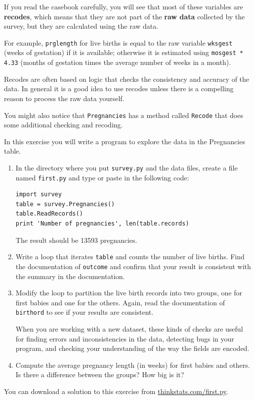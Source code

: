 \documentclass[12pt]{book}
\begin{document}
If you read the casebook carefully, you will see that most of these
variables are {\bf recodes}, which means that they are not part
of the {\bf raw data} collected by the survey, but they are
calculated using the raw data.

For example, {\tt prglength} for live births is equal to the raw
variable {\tt wksgest} (weeks of gestation) if it is available;
otherwise it is estimated using {\tt mosgest * 4.33} (months of
gestation times the average number of weeks in a month).

Recodes are often based on logic that checks the consistency and
accuracy of the data.  In general it is a good idea to use recodes
unless there is a compelling reason to process the raw data
yourself.

You might also notice that {\tt Pregnancies} has a method called
{\tt Recode} that does some additional checking and recoding.

\begin{ex}

In this exercise you will write a program to explore the data
in the Pregnancies table.

\begin{enumerate}

\item In the directory where you put {\tt survey.py} and the
data files, create a file named \verb"first.py" and
type or paste in the following code:

\begin{verbatim}
import survey
table = survey.Pregnancies()
table.ReadRecords()
print 'Number of pregnancies', len(table.records)
\end{verbatim}

The result should be 13593 pregnancies.

\item Write a loop that iterates \verb"table" and counts
the number of live births.  Find the documentation of {\tt outcome}
and confirm that your result is consistent with the summary
in the documentation.

\item Modify the loop to partition the live birth records into
two groups, one for first babies and one for the others.  Again,
read the documentation of {\tt birthord} to see if your results
are consistent.

When you are working with a new dataset, these kinds of checks
are useful for finding errors and inconsistencies in the data,
detecting bugs in your program, and checking your understanding
of the way the fields are encoded.

\item Compute the average pregnancy length (in weeks) for first
babies and others.  Is there a difference between the groups?  How
big is it?

\end{enumerate}

You can download a solution to this exercise from
\url{thinkstats.com/first.py}.

\end{ex}
\end{document}
